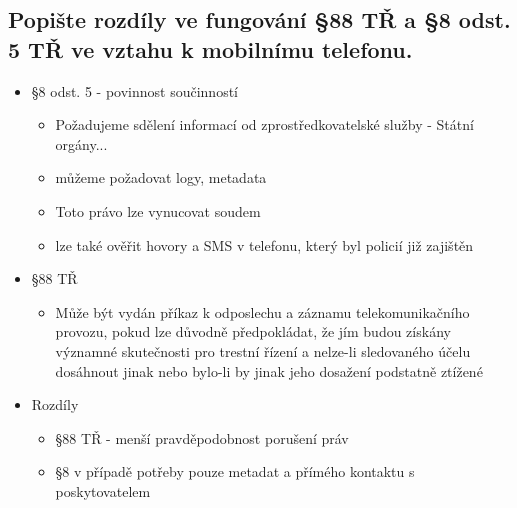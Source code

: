 \subsection{Popište rozdíly ve fungování §88 TŘ a §8 odst. 5 TŘ ve vztahu k mobilnímu telefonu.}
\begin{itemize}
    \item §8 odst. 5 - povinnost součinností
          \begin{itemize}
              \item Požadujeme sdělení informací od zprostředkovatelské služby - Státní orgány...
              \item můžeme požadovat logy, metadata
              \item Toto právo lze vynucovat soudem
              \item lze také ověřit hovory a SMS v telefonu, který byl policií již zajištěn\\
          \end{itemize}

    \item §88 TŘ
          \begin{itemize}
              \item Může být vydán příkaz k odposlechu a záznamu telekomunikačního provozu, pokud lze důvodně předpokládat, že jím budou získány významné skutečnosti pro trestní řízení a nelze-li sledovaného účelu dosáhnout jinak nebo bylo-li by jinak jeho dosažení podstatně ztížené
          \end{itemize}
    \item Rozdíly
          \begin{itemize}
              \item §88 TŘ - menší pravděpodobnost porušení práv
              \item §8 v případě potřeby pouze metadat a přímého kontaktu s poskytovatelem
          \end{itemize}
\end{itemize}


